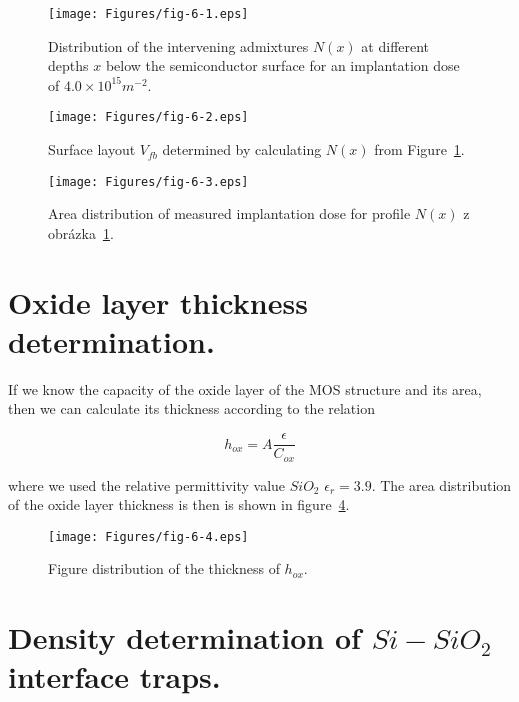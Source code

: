 \begin{figure}[h!]\centering
  \texttt{[image: Figures/fig-6-1.eps]}%
  \caption[The distribution of tangents $N(x)$ at different depths
    $x$]{Distribution of the intervening admixtures $N(x)$ at
    different depths $x$ below the semiconductor surface for an
    implantation dose of $4.0 \times 10^{15}m^{-2}$.}\label{fig:6.1}
\end{figure}

\begin{figure}[h!]\centering
  \texttt{[image: Figures/fig-6-2.eps]}
  \caption[Surface layout $V_{fb}$]{Surface layout $V_{fb}$ determined
    by calculating $N(x)$ from Figure~\ref{fig:6.1}.}\label{fig:6.2}
\end{figure}

\begin{figure}[h!]\centering
  \texttt{[image: Figures/fig-6-3.eps]}
  \caption[Area distribution of measured implantation dose]{Area
    distribution of measured implantation dose for profile $N(x)$ z
    obrázka~\ref{fig:6.1}.}\label{fig:6.3}
\end{figure}

\section{Oxide layer thickness determination.}\label{sec:6.2}

If we know the capacity of the oxide layer of the MOS structure and
its area, then we can calculate its thickness according to the
relation

\begin{equation}\label{eq:6.3}
  h_{ox} = A \frac{\epsilon}{C_{ox}}
\end{equation}

where we used the relative permittivity value $SiO_{2}$
$\epsilon_{r}=3.9$. The area distribution of the oxide layer thickness
is then is shown in figure~\ref{fig:6.4}.

\begin{figure}[h!]\centering
  \texttt{[image: Figures/fig-6-4.eps]}
  \caption[Plane distribution of the thickness of the $h_{ox}$]{Figure
    distribution of the thickness of $h_{ox}$.}\label{fig:6.4}
\end{figure}

\section{Density determination of $Si-SiO_{2}$ interface traps.}\label{sec:6.3}

